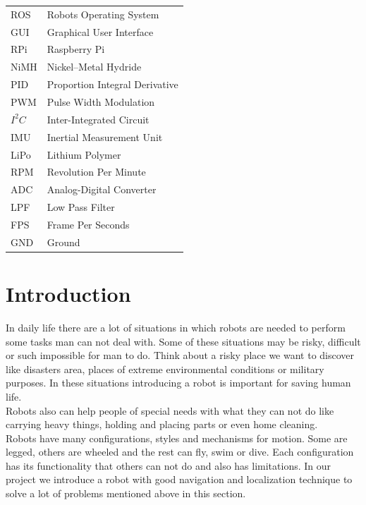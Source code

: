 \documentclass[12pt]{article}
\begin{document}
 \begin{tabular}{  l    l   }
    ROS & Robots Operating System	\\
    GUI & Graphical User Interface	\\
    RPi &   Raspberry Pi	\\
    NiMH & Nickel–Metal Hydride\\
    PID & Proportion Integral Derivative  \\  
    PWM &  Pulse Width Modulation  \\   
    $I^2C$  & Inter-Integrated Circuit   \\  
    IMU &  Inertial Measurement Unit \\  
    LiPo &   Lithium Polymer\\ 
    RPM   & Revolution Per Minute  \\
    ADC   & Analog-Digital Converter   \\  
    LPF & Low Pass Filter \\
    FPS & Frame Per Seconds\\
    GND & Ground
    
  \end{tabular} 

\newpage
\renewcommand{\headrulewidth}{.5pt}


\tableofcontents
\newpage
\listoffigures
\thispagestyle{empty}
\newpage
{}
\setcounter{page}{1}


\section{Introduction}
 In daily life there are a lot of situations in which robots are needed to perform some tasks man can not deal with. Some of these situations may be risky, difficult or such impossible for man to do. Think about a risky place we want to discover like disasters area, places of extreme environmental conditions or military purposes. In these situations introducing a robot is important for saving human life.\\
 Robots also can help people of special needs with what they can not do like carrying heavy things, holding and placing parts or even home cleaning.\\
 Robots have many configurations, styles and mechanisms for motion. Some are legged, others are wheeled and the rest can fly, swim or dive. Each configuration has its functionality that others can not do and also has limitations.
 In our project we introduce a robot with good navigation and localization technique to solve a lot of problems mentioned above in this section. 
\end{document}
